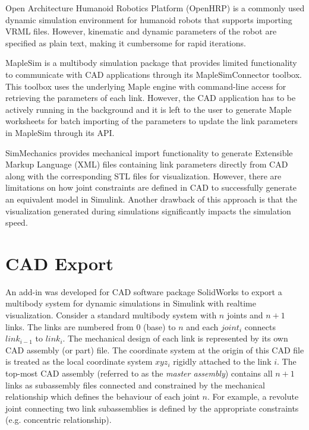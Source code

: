 Open Architecture Humanoid Robotics Platform (OpenHRP) \cite{Kanehiro:2004dq} is a commonly used dynamic simulation environment for humanoid robots that supports importing VRML files. However, kinematic and dynamic parameters of the robot are specified as plain text, making it cumbersome for rapid iterations.

MapleSim \cite{sw:maplesim} is a multibody simulation package that provides limited functionality to communicate with CAD applications through its MapleSimConnector toolbox. This toolbox uses the underlying Maple engine with command-line access for retrieving the parameters of each link. However, the CAD application has to be actively running in the background and it is left to the user to generate Maple worksheets for batch importing of the parameters to update the link parameters in MapleSim through its API.

SimMechanics \cite{sw:simmech} provides mechanical import functionality to generate Extensible Markup Language (XML) files containing link parameters directly from CAD along with the corresponding STL files for visualization. However, there are limitations on how joint constraints are defined in CAD to successfully generate an equivalent model in Simulink. Another drawback of this approach is that the visualization generated during simulations significantly impacts the simulation speed.

\section{CAD Export} %
\label{sec:cad_export}

An add-in was developed for CAD software package SolidWorks to export a multibody system for dynamic simulations in Simulink with realtime visualization. Consider a standard multibody system with $n$ joints and $n + 1$ links. The links are numbered from 0 (base) to $n$ and each $joint_{i}$ connects $link_{i-1}$ to $link_{i}$. The mechanical design of each link is represented by its own CAD assembly (or part) file. The coordinate system at the origin of this CAD file is treated as the local coordinate system $xyz_{i}$ rigidly attached to the link $i$. The top-most CAD assembly (referred to as the \emph{master assembly}) contains all $n + 1$ links as subassembly files connected and constrained by the mechanical relationship which defines the behaviour of each joint $n$. For example, a revolute joint connecting two link subassemblies is defined by the appropriate constraints (e.g. concentric relationship).

